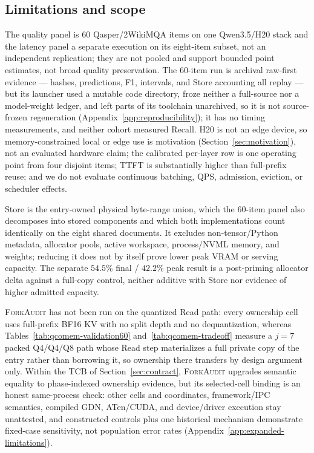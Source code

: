 \documentclass{article}
\newcommand{\method}{\textsc{ForkAudit}}
\begin{document}
\subsection{Limitations and scope}
\label{sec:limitations}

The quality panel is 60 Qasper/2WikiMQA items on one Qwen3.5/H20 stack and the
latency panel a separate execution on its eight-item subset, not an independent
replication; they are not pooled and support bounded point estimates, not broad
quality preservation. The 60-item run is archival raw-first evidence ---
hashes, predictions, F1, intervals, and Store accounting all replay --- but its
launcher used a mutable code directory, froze neither a full-source nor a
model-weight ledger, and left parts of its toolchain unarchived, so it is not
source-frozen regeneration (Appendix~\ref{app:reproducibility}); it has no
timing measurements, and neither cohort measured Recall. H20 is not an edge
device, so memory-constrained local or edge use is motivation
(Section~\ref{sec:motivation}), not an evaluated hardware claim; the calibrated
per-layer row is one operating point from four disjoint items; TTFT is
substantially higher than full-prefix reuse; and we do not evaluate continuous
batching, QPS, admission, eviction, or scheduler effects.

Store is the entry-owned physical byte-range union, which the 60-item panel
also decomposes into stored components and which both implementations count
identically on the eight shared documents.  It excludes non-tensor/Python
metadata, allocator pools, active workspace, process/NVML memory, and weights;
reducing it does not by itself prove lower peak VRAM or serving capacity.  The
separate $54.5\%$ final / $42.2\%$ peak result is a post-priming allocator delta
against a full-copy control, neither additive with Store nor evidence of higher
admitted capacity.

\method{} has not been run on the quantized Read path: every ownership cell uses
full-prefix BF16 KV with no split depth and no dequantization, whereas
Tables~\ref{tab:qcomem-validation60} and~\ref{tab:qcomem-tradeoff} measure a
$j=7$ packed Q4/Q4/Q8 path whose Read step materializes a full private copy of
the entry rather than borrowing it, so ownership there transfers by design
argument only.  Within the TCB of Section~\ref{sec:contract}, \method{} upgrades
semantic equality to phase-indexed ownership evidence, but its selected-cell
binding is an honest same-process check: other cells and coordinates,
framework/IPC semantics, compiled GDN, ATen/CUDA, and device/driver execution
stay unattested, and constructed controls plus one historical mechanism
demonstrate fixed-case sensitivity, not population error rates
(Appendix~\ref{app:expanded-limitations}).
\end{document}
